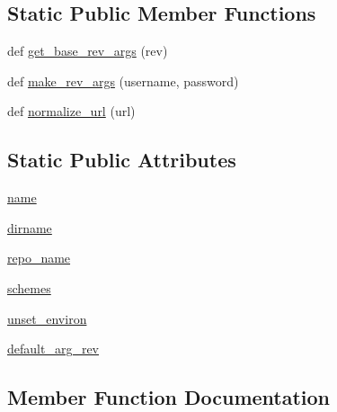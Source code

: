 \subsection*{Static Public Member Functions}
\begin{DoxyCompactItemize}
\item 
def \hyperlink{classpip_1_1__internal_1_1vcs_1_1versioncontrol_1_1VersionControl_a8bf8e9d4e4c270a2010ebee8b39044e1}{get\+\_\+base\+\_\+rev\+\_\+args} (rev)
\item 
def \hyperlink{classpip_1_1__internal_1_1vcs_1_1versioncontrol_1_1VersionControl_aaa527596c67661e61f407396615688d5}{make\+\_\+rev\+\_\+args} (username, password)
\item 
def \hyperlink{classpip_1_1__internal_1_1vcs_1_1versioncontrol_1_1VersionControl_ae182e56fb2b7b7df4669bb335ac8187e}{normalize\+\_\+url} (url)
\end{DoxyCompactItemize}
\subsection*{Static Public Attributes}
\begin{DoxyCompactItemize}
\item 
\hyperlink{classpip_1_1__internal_1_1vcs_1_1versioncontrol_1_1VersionControl_ad4d195fdcc6f01601aa267ae571b4732}{name}
\item 
\hyperlink{classpip_1_1__internal_1_1vcs_1_1versioncontrol_1_1VersionControl_acc3c666f2e569f1b0f925a9d595c06ba}{dirname}
\item 
\hyperlink{classpip_1_1__internal_1_1vcs_1_1versioncontrol_1_1VersionControl_ab75c1eedb3b7ac7881aefb09b1b70416}{repo\+\_\+name}
\item 
\hyperlink{classpip_1_1__internal_1_1vcs_1_1versioncontrol_1_1VersionControl_a48e3bfe65f9774328f10af9ca9a5368d}{schemes}
\item 
\hyperlink{classpip_1_1__internal_1_1vcs_1_1versioncontrol_1_1VersionControl_a9e05b6f3c969959cb0625525fec41730}{unset\+\_\+environ}
\item 
\hyperlink{classpip_1_1__internal_1_1vcs_1_1versioncontrol_1_1VersionControl_a08ff6d9279c5c43fd7be066742f6b305}{default\+\_\+arg\+\_\+rev}
\end{DoxyCompactItemize}


\subsection{Member Function Documentation}
\mbox{\label{classpip_1_1__internal_1_1vcs_1_1versioncontrol_1_1VersionControl_aad894f57f53bf430b8b10173dd2c7a1f}} 
